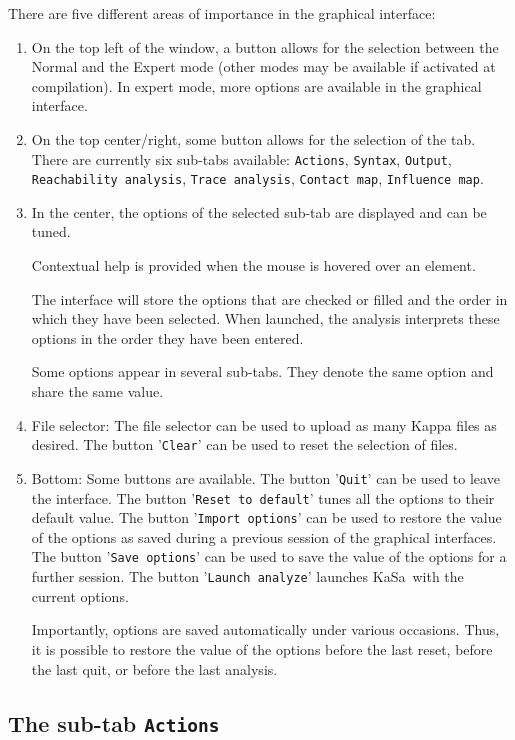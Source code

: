 \documentclass[11pt]{book}
\def\KaSa{\textsf{KaSa}}
\begin{document}
There are five different areas of importance in the graphical interface:
\begin{enumerate}
\item On the top left of the window, a button allows for the selection between the Normal and the Expert mode (other modes may be available if activated at compilation).
In expert mode, more options are available in the graphical interface.
\item On the top center/right, some button allows for the selection of the tab. There are currently six sub-tabs available: \texttt{Actions}, \texttt{Syntax}, \texttt{Output}, \texttt{Reachability analysis}, \texttt{Trace analysis}, \texttt{Contact map}, \texttt{Influence map}.

\item In the center, the options of the selected sub-tab are displayed and can be tuned.

Contextual help is provided when the mouse is hovered over an element.

The interface will store the options that are checked or filled and the order in which they have been selected.
When launched, the analysis interprets these options in the order they have been entered.

Some options appear in several sub-tabs. They denote the same option and share the same value.

\item File selector: The file selector can be used to upload as many Kappa files as desired. The button '\texttt{Clear}' can be used to reset the selection of files.
\item Bottom: Some buttons are available. The button '\texttt{Quit}' can be used to leave the interface. The button '\texttt{Reset to default}' tunes all the options to their default value. The button '\texttt{Import options}' can be used to restore the value of the options as saved during a previous session of the graphical interfaces. The button '\texttt{Save options}' can be used to save the value of the options for a further session. The button '\texttt{Launch analyze}' launches \KaSa\ with the current options.

Importantly, options are saved automatically under various occasions. Thus, it is possible to restore the value of the options
before the last reset, before the last quit, or before the last analysis.
\end{enumerate}

\subsection{The sub-tab \texttt{Actions}}
\end{document}
